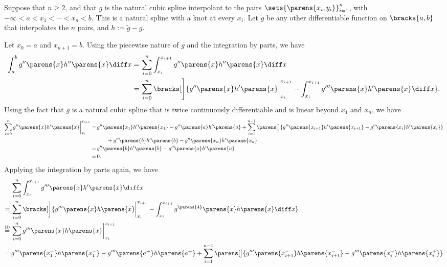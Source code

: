 \documentclass[12pt]{article}
\begin{document}
\begin{enumerate}[label=\textbf{\arabic*.}]
	Suppose that $n \ge 2$, and that $g$ is the natural cubic spline interpolant to the pairs $\sets{ \parens{x_i, y_i} }_{i=1}^n$, with $-\infty < a < x_1 < \cdots < x_n < b$. This is a natural spline with a knot at every $x_i$. 
	Let $\tilde{g}$ be any other differentiable function on $\bracks{a, b}$ that interpolates the $n$ pairs, 	and $h := \tilde{g} - g$. 
	
	Let $x_0 = a$ and $x_{n+1} = b$. Using the piecewise nature of $g$ and the integration by parts, we have 
	\begin{align*}
		\int_a^b g'' \parens{x} h'' \parens{x} \diff x = & \, \sum_{i=0}^{n} \int_{x_i}^{x_{i+1}} g'' \parens{x} h'' \parens{x} \diff x \\
		= & \, \sum_{i=0}^n \bracks[\Bigg]{g'' \parens{x} h' \parens{x} \bigg\vert_{x_{i}}^{x_{i+1}} - \int_{x_{i}}^{x_{i+1}} g''' \parens{x} h' \parens{x} \diff x}. 
	\end{align*}
	Using the fact that $g$ is a natural cubic spline that is twice continuously differentiable and is linear beyond $x_1$ and $x_n$, we have 
	\begin{align*}
		\sum_{i=0}^n g'' \parens{x} h' \parens{x} \bigg\vert_{x_{i}}^{x_{i+1}} = & \, g'' \parens{x_1} h' \parens{x_1} - g'' \parens{a} h' \parens{a} + \sum_{i=1}^{n-1} \parens[\big]{g'' \parens{x_{i+1}} h'\parens{x_{i+1}} - g'' \parens{x_{i}} h'\parens{x_{i}}} \\ 
		& \qquad + g'' \parens{b} h' \parens{b} - g'' \parens{x_{n}} h' \parens{x_{n}} \\
		= & \, g'' \parens{b} h' \parens{b} - g'' \parens{a} h' \parens{a} \\
		= & \, 0.
	\end{align*}
	Applying the integration by parts again, we have
	\begin{align*}
		& \, \sum_{i=0}^n \int_{x_{i}}^{x_{i+1}} g''' \parens{x} h' \parens{x} \diff x \\
		= & \, \sum_{i=0}^n \bracks[\bigg]{g''' \parens{x} h \parens{x} \bigg\vert_{x_i}^{x_{i+1}} - \int_{x_i}^{x_{i+1}} g^{\parens{4}} \parens{x} h \parens{x} \diff x} \\
		\stackrel{\text{(i)}}{=} & \, \sum_{i=0}^n g''' \parens{x} h \parens{x} \bigg\vert_{x_i}^{x_{i+1}} \\
		= & \, g''' \parens{x_1^-} h \parens{x_1^-} - g''' \parens{a^+} h \parens{a^+} + \sum_{i=1}^{n-1} \parens[\big]{g''' \parens{x_{i+1}^-} h \parens{x_{i+1}^-} - g''' \parens{x_{i}^+} h \parens{x_{i}^+}} \\

\end{align*}
\end{enumerate}
\end{document}

